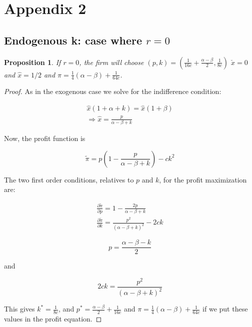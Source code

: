 \documentclass[12pt]{article}
\newtheorem{proposition}{Proposition}
\numberwithin{equation}{section}
\begin{document}
\section{Appendix 2}


\subsection{Endogenous k: case where $r=0$}

\begin{proposition}
If $r=0$, the firm will choose $(p,k)=(\frac{1}{16c}+\frac{\alpha-\beta}{2},\frac{1}{8c})$ $\check{x}=0$ and $\hat{x}=1/2$ and $\pi= \frac{1}{4}(\alpha-\beta)+\frac{1}{64c}$.
\end{proposition}

\begin{proof}


As in the exogenous case we solve for the indifference condition:

\begin{align*}
\hat{x}(1+\alpha+k)=\hat{x}(1+\beta) \\
\Rightarrow \hat{x} = \frac{p}{\alpha - \beta +k}
\end{align*}


Now, the profit function is

\begin{equation*}
\tilde{\pi} = p\left(1-\frac{p}{\alpha - \beta +k}\right)-c k^2
\end{equation*}

The two first order conditions, relatives to $p$ and $k$, for the profit maximization are:

\begin{align*}
\frac{\partial \tilde{\pi}}{\partial p}= 1-\frac{2p}{\alpha - \beta +k}\\
\frac{\partial \tilde{\pi}}{\partial k}=  \frac{p^2}{(\alpha-\beta+k)^2}-2ck 
\end{align*} 

\begin{equation*}
p = \frac{\alpha-\beta-k}{2}
\end{equation*}

and 

\begin{equation*}
2ck = \frac{p^2}{(\alpha-\beta+k)^2}
\end{equation*}

This gives $k^*=\frac{1}{8c}$,  and $p^*=\frac{\alpha-\beta}{2}+\frac{1}{16c}$ and $\pi=\frac{1}{4}(\alpha-\beta)+\frac{1}{64c} $ if we put these values in the profit equation. 

\end{proof}
\end{document}
